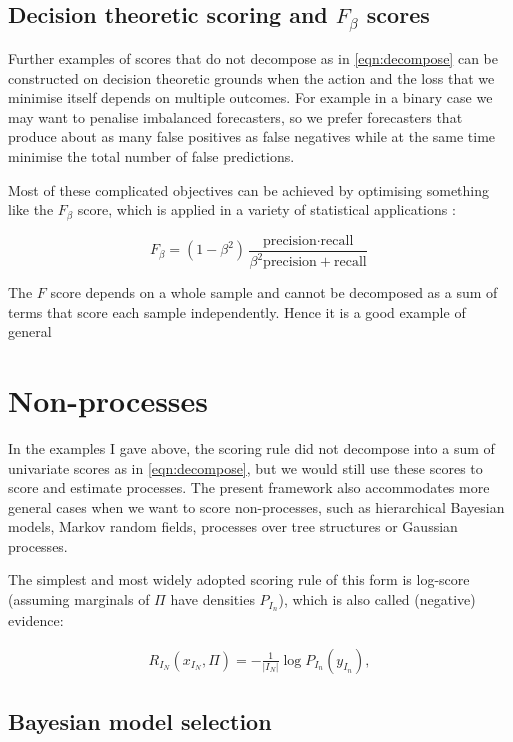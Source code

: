 \subsection{Decision theoretic scoring and $F_{\beta}$ scores}

Further examples of scores that do not decompose as in \eqref{eqn:decompose} can be constructed on decision theoretic grounds when the action and the loss that we minimise itself depends on multiple outcomes. For example in a binary case we may want to penalise imbalanced forecasters, so we prefer forecasters that produce about as many false positives as false negatives while at the same time minimise the total number of false predictions.

Most of these complicated objectives can be achieved by optimising something like the $F_{\beta}$ score, which is applied in a variety of statistical applications \cite{}:

\begin{equation}
	F_\beta = (1-\beta^2)\frac{\mbox{precision}\cdot\mbox{recall}}{\beta^2 \mbox{precision} + \mbox{recall}}
\end{equation}

The $F$ score depends on a whole sample and cannot be decomposed as a sum of terms that score each sample independently. Hence it is a good example of general

\section{Non-\iid processes}

In the examples I gave above, the scoring rule did not decompose into a sum of univariate scores as in \eqref{eqn:decompose}, but we would still use these scores to score and estimate \iid processes. The present framework also accommodates more general cases when we want to score non-\iid processes, such as hierarchical Bayesian models, Markov random fields, processes over tree structures or Gaussian processes.

The simplest and most widely adopted scoring rule of this form is log-score (assuming marginals of $\Pi$ have densities $P_{I_n}$), which is also called (negative) evidence:

\begin{align}
	R_{I_N}(x_{I_N},\Pi) = - \frac{1}{\vert I_N \vert}\log P_{I_n}(y_{I_n}),
\end{align}

\subsection{Bayesian model selection}

